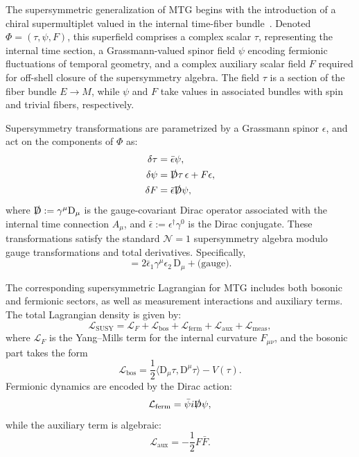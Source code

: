 \documentclass[11pt]{article}
\begin{document}
The supersymmetric generalization of MTG begins with the introduction of a chiral supermultiplet valued in the internal time-fiber bundle~\cite{connes1996gravity, rovelli2015evolving}. Denoted \( \Phi = (\tau, \psi, F) \), this superfield comprises a complex scalar \( \tau \), representing the internal time section, a Grassmann-valued spinor field \( \psi \) encoding fermionic fluctuations of temporal geometry, and a complex auxiliary scalar field \( F \) required for off-shell closure of the supersymmetry algebra. The field \( \tau \) is a section of the fiber bundle \( E \to M \), while \( \psi \) and \( F \) take values in associated bundles with spin and trivial fibers, respectively.

Supersymmetry transformations are parametrized by a Grassmann spinor \( \epsilon \), and act on the components of \( \Phi \) as:
\begin{align}
\delta \tau &= \bar{\epsilon} \psi, \\
\delta \psi &= \slashed{\mathrm{D}} \tau \, \epsilon + F \epsilon, \\
\delta F &= \bar{\epsilon} \slashed{\mathrm{D}} \psi,
\end{align}
where \( \slashed{\mathrm{D}} := \gamma^\mu \mathrm{D}_\mu \) is the gauge-covariant Dirac operator associated with the internal time connection \( A_\mu \), and \( \bar{\epsilon} := \epsilon^\dagger \gamma^0 \) is the Dirac conjugate. These transformations satisfy the standard \( \mathcal{N}=1 \) supersymmetry algebra modulo gauge transformations and total derivatives. Specifically,
\begin{equation}
[\delta_1, \delta_2] = 2 \bar{\epsilon}_1 \gamma^\mu \epsilon_2 \, \mathrm{D}_\mu + \text{(gauge)}.
\end{equation}

The corresponding supersymmetric Lagrangian for MTG includes both bosonic and fermionic sectors, as well as measurement interactions and auxiliary terms. The total Lagrangian density is given by:
\begin{equation}
\mathcal{L}_{\mathrm{SUSY}} = \mathcal{L}_F + \mathcal{L}_{\mathrm{bos}} + \mathcal{L}_{\mathrm{ferm}} + \mathcal{L}_{\mathrm{aux}} + \mathcal{L}_{\mathrm{meas}},
\end{equation}
where \( \mathcal{L}_F \) is the Yang--Mills term for the internal curvature \( F_{\mu\nu} \), and the bosonic part takes the form
\begin{equation}
\mathcal{L}_{\mathrm{bos}} = \frac{1}{2} \langle \mathrm{D}_\mu \tau, \mathrm{D}^\mu \tau \rangle - V(\tau).
\end{equation}
Fermionic dynamics are encoded by the Dirac action:
\begin{equation}
\mathcal{L}_{\mathrm{ferm}} = \bar{\psi} i \slashed{\mathrm{D}} \psi,
\end{equation}
while the auxiliary term is algebraic:
\begin{equation}
\mathcal{L}_{\mathrm{aux}} = - \frac{1}{2} F \bar{F}.
\end{equation}
\end{document}
